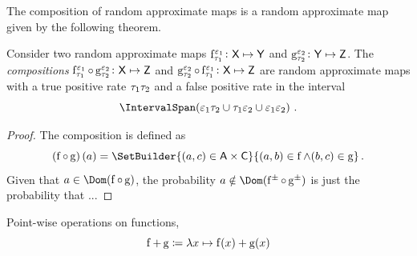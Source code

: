 \documentclass[11pt,final,hidelinks]{article}
\begin{document}
The composition of random approximate maps is a random approximate map given by the following theorem.
\begin{theorem}
	Consider two random approximate maps $\APFun{f}[\tprate_1][\fprate_1] \colon \Set{X} \mapsto \Set{Y}$ and $\APFun{g}[\tprate_2][\fprate_2] \colon \Set{Y} \mapsto \Set{Z}$.
	The \emph{compositions} $\APFun{f}[\tprate_1][\fprate_1] \circ \APFun{g}[\tprate_2][\fprate_2] \colon \Set{X} \mapsto \Set{Z}$ and $\APFun{g}[\tprate_2][\fprate_2] \circ \APFun{f}[\tprate_1][\fprate_1] \colon \Set{X} \mapsto \Set{Z}$ are random approximate maps with a true positive rate $\tau_1 \tau_2$ and a false positive rate in the interval
	\begin{equation}
	\IntervalSpan\!\left(\fprate_1 \tprate_2 \SetUnion \tprate_1 \fprate_2 \SetUnion \fprate_1 \fprate_2\right)\,.
	\end{equation}
\end{theorem}
\begin{proof}
	The composition is defined as
	\begin{equation}
	\left(\PFun{f} \circ \PFun{g}\right)(a) = \SetBuilder{(a,c) \in \Set{A} \times \Set{C}}{(a,b) \in \PFun{f} \land (b,c) \in \PFun{g}}\,.
	\end{equation}
	Given that $a \in \Dom\!\left(\PFun{f} \circ \PFun{g}\right)$, the probability $a \notin \Dom(\APFun{f} \circ \APFun{g})$ is just the probability that  ...
\end{proof}





Point-wise operations on functions,
\begin{equation}
\PFun{f} + \PFun{g} \coloneq \lambda x \mapsto \PFun{f}(x) + \PFun{g}(x)
\end{equation}
\end{document}
